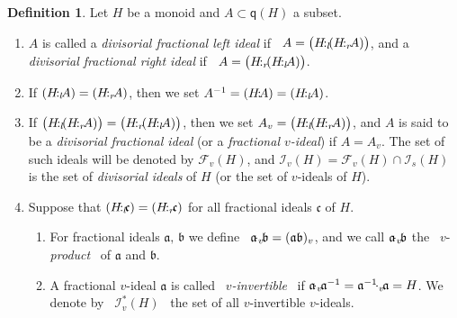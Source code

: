 \documentclass[a4paper]{amsart}
\theoremstyle{definition}
\newtheorem{definition}[theorem]{Definition}
\numberwithin{equation}{section}
\begin{document}
\medskip
\begin{definition} \label{3.5}
Let $H$ be a monoid and $A \subset \mathsf q (H)$ a subset.
\begin{enumerate}
\item $A$ is called a {\it divisorial fractional left ideal} if \ $A = \big( H {\negthinspace :_l \negthinspace} (H {\negthinspace :_r \negthinspace} A) \big)$, and a {\it divisorial fractional right ideal} if \ $A = \big( H {\negthinspace :_r \negthinspace} (H {\negthinspace :_l \negthinspace} A) \big)$.

\smallskip
\item If  $(H {\negthinspace :_l \negthinspace} A) = (H {\negthinspace :_r \negthinspace} A)$, then we set $A^{-1} = (H {\negthinspace : \negthinspace} A) = (H {\negthinspace :_l \negthinspace} A)$.

\smallskip
\item If $\big( H {\negthinspace :_l \negthinspace} (H {\negthinspace :_r \negthinspace} A)\big) = \big( H {\negthinspace :_r \negthinspace} (H {\negthinspace :_l \negthinspace} A)\big)$, then
we set $A_v = \big( H {\negthinspace :_l \negthinspace} (H {\negthinspace :_r \negthinspace} A)\big)$, and  $A$ is said to be a
{\it divisorial fractional ideal} (or a {\it fractional $v$-ideal})
if $A = A_v$. The  set of such ideals will be denoted by $\mathcal
F_v (H)$, and $\mathcal I_v (H) = \mathcal F_v (H) \cap \mathcal I_s
(H)$ is the set of {\it divisorial ideals} of $H$ (or the set of
$v$-ideals of $H$).

\smallskip
\item
Suppose that $(H {\negthinspace :_l \negthinspace} \mathfrak c) = (H {\negthinspace :_r \negthinspace} \mathfrak c)$ for all fractional ideals $\mathfrak c$ of $H$.
      \begin{enumerate}

      \smallskip
      \item For fractional ideals $\mathfrak a, \,\mathfrak b$ we define \ $\mathfrak a {\negthinspace \cdot_v \negthinspace} \mathfrak b = (\mathfrak a \mathfrak b)_v$, and we call $\mathfrak a {\negthinspace \cdot_v \negthinspace} \mathfrak b$ the \ $v$-{\it product} \ of $\mathfrak a$ and $\mathfrak b$.

      \smallskip
      \item A fractional $v$-ideal $\mathfrak a$ is called \ {\it $v$-invertible} \ if $\mathfrak a {\negthinspace \cdot_v \negthinspace} \mathfrak a^{-1} = \mathfrak a^{-1} {\negthinspace \cdot_v \negthinspace} \mathfrak a = H$. We denote by \ $\mathcal I_v^*(H)$ \ the set of all $v$-invertible $v$-ideals.

      \end{enumerate}
\end{enumerate}
\end{definition}
\end{document}
